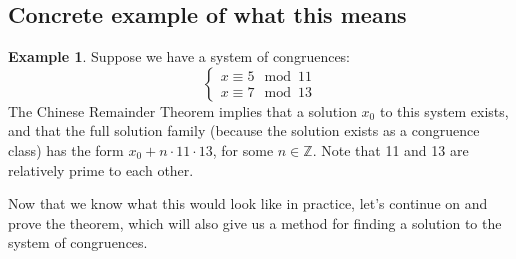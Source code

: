 \documentclass[10pt]{article}
\newcommand{\Z}{\mathbb{Z}}
\theoremstyle{definition}
\newtheorem{ex}[theorem]{Example}
\theoremstyle{remark}
\def\Z{\mathbb{ Z}}
\begin{document}
\subsection{Concrete example of what this means}
\begin{ex}
Suppose we have a system of congruences:
$$\begin{cases}
x \equiv 5 \mod 11\\
x \equiv 7 \mod 13
\end{cases}$$
The Chinese Remainder Theorem implies that a solution $x_0$ to this system exists, and that the full solution family (because the solution exists as a congruence class) has the form $x_0 + n \cdot 11 \cdot 13$, for some $n \in \Z$.  Note that 11 and 13 are relatively prime to each other.
\end{ex}

Now that we know what this would look like in practice, let's continue on and prove the theorem, which will also give us a method for finding a solution to the system of congruences.
\end{document}
